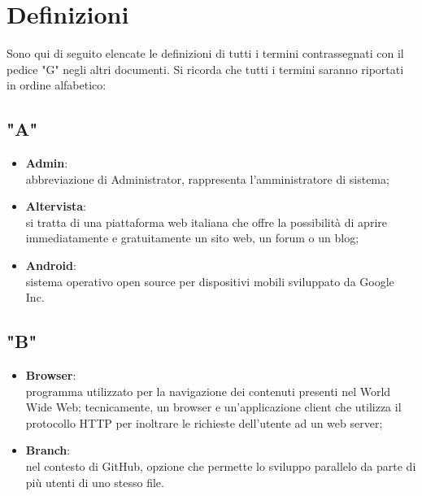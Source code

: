 \section{Definizioni}
Sono qui di seguito elencate le definizioni di tutti i termini contrassegnati con il pedice "G" negli altri documenti.
Si ricorda che tutti i termini saranno riportati in ordine alfabetico:

\subsection{"A"}
\begin{itemize}
\item \textbf{Admin}:\\ abbreviazione di Administrator, rappresenta l'amministratore di sistema;
\item \textbf{Altervista}:\\ si tratta di una piattaforma web italiana che offre la possibilità di aprire immediatamente e gratuitamente un sito web, un forum o un blog;
\item \textbf{Android}:\\ sistema operativo open source per dispositivi mobili sviluppato da Google Inc.
\end{itemize}
\subsection{"B"}
\begin{itemize}
\item \textbf{Browser}:\\ programma utilizzato per la navigazione dei contenuti presenti nel World Wide Web;
tecnicamente, un browser e un’applicazione client che utilizza il protocollo HTTP per inoltrare le richieste dell’utente ad un web server;
\item \textbf{Branch}:\\ nel contesto di GitHub, opzione che permette lo sviluppo parallelo da parte di più utenti di uno stesso file.
\end{itemize}
